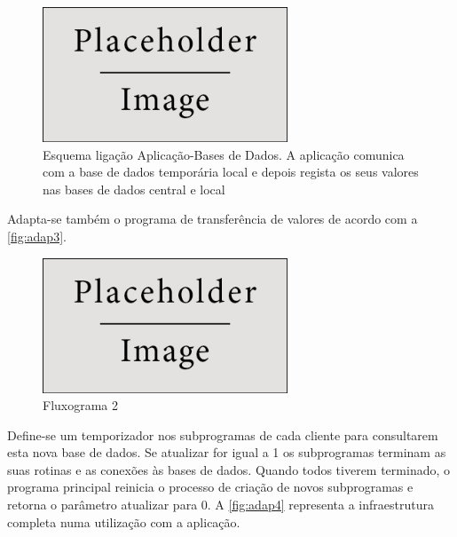 \documentclass[11pt,twoside,a4paper]{report}
\begin{document}
\begin{figure}[H]
	\begin{center}
		\includegraphics[width=0.65\textwidth]{placeholder} %
		\caption{Esquema ligação Aplicação-Bases de Dados. A aplicação comunica com a base de dados temporária local e depois regista os seus valores nas bases de dados central e local}
		\label{fig:adap2}
	\end{center}
\end{figure}
Adapta-se também o programa de transferência de valores de acordo com a \autoref{fig:adap3}.
\begin{figure}[H]
	\begin{center}
		\includegraphics[width=0.65\textwidth]{placeholder} %
		\caption{Fluxograma 2}
		\label{fig:adap3}
	\end{center}
\end{figure}
Define-se um temporizador nos subprogramas de cada cliente para consultarem esta nova base de dados. Se atualizar for igual a 1 os subprogramas terminam as suas rotinas e as conexões às bases de dados. Quando todos tiverem terminado, o programa principal reinicia o processo de criação de novos subprogramas e retorna o parâmetro atualizar para 0. A \autoref{fig:adap4} representa a infraestrutura completa numa utilização com a aplicação.
\end{document}
